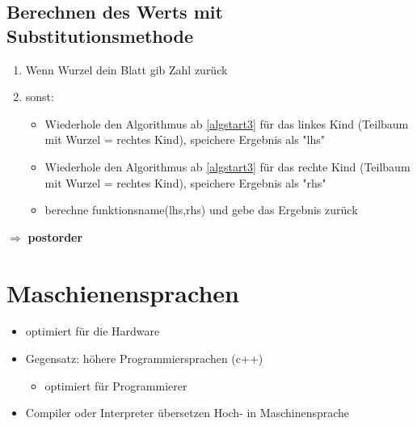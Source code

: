 \documentclass[a4paper]{scrartcl}
\begin{document}
\subsection{Berechnen des Werts mit Substitutionsmethode}
\label{sec-5-6}
\begin{enumerate}
\item \label{algstart3} Wenn Wurzel dein Blatt gib Zahl zurück
\item sonst:
\begin{itemize}
\item Wiederhole den Algorithmus ab \ref{algstart3} für das linkes Kind (Teilbaum mit Wurzel = rechtes Kind), speichere Ergebnis als "lhs"
\item Wiederhole den Algorithmus ab \ref{algstart3} für das rechte Kind (Teilbaum mit Wurzel = rechtes Kind), speichere Ergebnis als "rhs"
\item berechne funktionsname(lhs,rhs) und gebe das Ergebnis zurück
\end{itemize}
\end{enumerate}
$\Rightarrow$ \textbf{postorder}
\section{Maschienensprachen}
\label{sec-6}
\begin{itemize}
\item optimiert für die Hardware
\item Gegensatz: höhere Programmiersprachen (c++)
\begin{itemize}
\item optimiert für Programmierer
\end{itemize}
\item Compiler oder Interpreter übersetzen Hoch- in Maschinensprache
\end{itemize}
\end{document}
